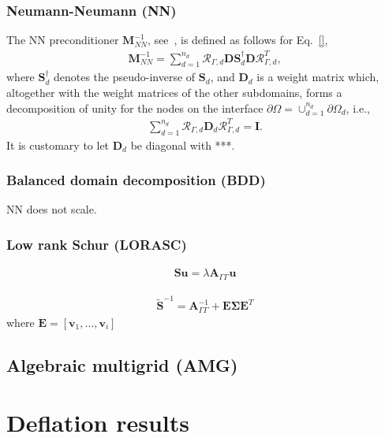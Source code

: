 \documentclass{article}
\begin{document}
\subsubsection{Neumann-Neumann (NN)}
The NN preconditioner $\mathbf{M}_{NN}^{-1}$, see~\cite{}, is defined as follows for Eq.~\eqref{},
\begin{align}
\mathbf{M}_{NN}^{-1}=\sum_{d=1}^{n_d}
\boldsymbol{\mathcal{R}}_{\Gamma,d}
\mathbf{D}
\mathbf{S}_d^\dagger
\mathbf{D}
\boldsymbol{\mathcal{R}}_{\Gamma,d}^T,
\end{align}
where $\mathbf{S}_d^\dagger$ denotes the pseudo-inverse of $\mathbf{S}_d$,
and $\mathbf{D}_d$ is a weight matrix which, altogether with the weight matrices of the other subdomains, 
forms a decomposition of unity for the nodes on the interface $\partial\Omega=\cup_{d=1}^{n_d}\partial\Omega_d$, i.e.,
\begin{align}
\sum_{d=1}^{n_d}
\boldsymbol{\mathcal{R}}_{\Gamma,d}
\mathbf{D}_d
\boldsymbol{\mathcal{R}}_{\Gamma,d}^T
=\mathbf{I}.
\end{align}
It is customary to let $\mathbf{D}_d$ be diagonal with ***.

\subsubsection{Balanced domain decomposition (BDD)}
NN does not scale.

\subsubsection{Low rank Schur (LORASC)}

\begin{align}
\mathbf{S}\mathbf{u}=\lambda\mathbf{A}_{\Gamma\Gamma}\mathbf{u}
\end{align}

\begin{align}
\tilde{\mathbf{S}}^{-1}=\mathbf{A}_{\Gamma\Gamma}^{-1}+\mathbf{E}\boldsymbol{\Sigma}\mathbf{E}^T
\end{align}
where $\mathbf{E}=[\mathbf{v}_1,\dots,\mathbf{v}_i]$

\subsection{Algebraic multigrid (AMG)}

\section{Deflation results}
\end{document}
